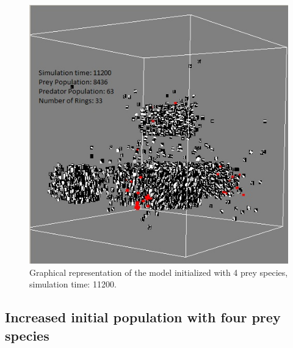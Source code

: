 \documentclass[letterpaper]{article}
\numberwithin{equation}{section}
\begin{document}
\begin{figure}[H]
	\centering
	\label{fig:screenshot-simTime11K-4Prey}
	\includegraphics[scale=0.55]{../tex/images/simTime11K-4Prey}
	\caption[Graphical representation of the model (simulation time: 11200)]{Graphical representation of the model initialized with 4 prey species, simulation time: 11200.}
\end{figure}

\subsection{Increased initial population with four prey species}
\end{document}
